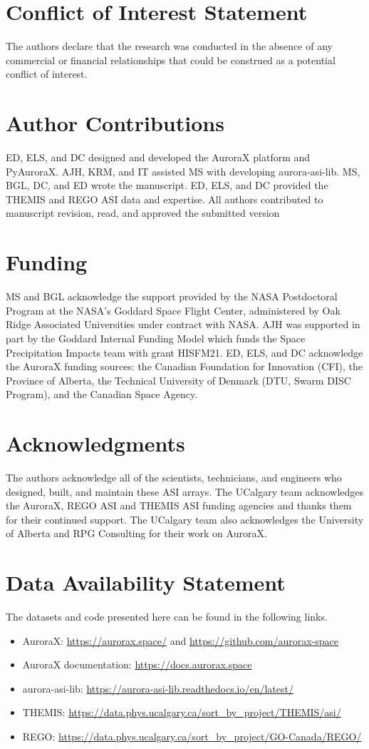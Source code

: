 \documentclass[utf8]{FrontiersinHarvard} %
\begin{document}
\section*{Conflict of Interest Statement}
The authors declare that the research was conducted in the absence of any commercial or financial relationships that could be construed as a potential conflict of interest.

\section*{Author Contributions}
ED, ELS, and DC designed and developed the AuroraX platform and PyAuroraX. AJH, KRM, and IT assisted MS with developing aurora-asi-lib. MS, BGL, DC, and ED wrote the manuscript. ED, ELS, and DC provided the THEMIS and REGO ASI data and expertise.  All authors contributed to manuscript revision, read, and approved the submitted version

\section*{Funding}
MS and BGL acknowledge the support provided by the NASA Postdoctoral Program at the NASA's Goddard Space Flight Center, administered by Oak Ridge Associated Universities under contract with NASA. AJH was supported in part by the Goddard Internal Funding Model which funds the Space Precipitation Impacts team with grant HISFM21. ED, ELS, and DC acknowledge the AuroraX funding sources: the Canadian Foundation for Innovation (CFI), the Province of Alberta, the Technical University of Denmark (DTU, Swarm DISC Program), and the Canadian Space Agency.

\section*{Acknowledgments}
The authors acknowledge all of the scientists, technicians, and engineers who designed, built, and maintain these ASI arrays. The UCalgary team acknowledges the AuroraX, REGO ASI and THEMIS ASI funding agencies and thanks them for their continued support. The UCalgary team also acknowledges the University of Alberta and RPG Consulting for their work on AuroraX. 

\section*{Data Availability Statement}
The datasets and code presented here can be found in the following links.
\begin{itemize}
    \item AuroraX: \url{https://aurorax.space/} and \url{https://github.com/aurorax-space}
    \item AuroraX documentation: \url{https://docs.aurorax.space}
    \item aurora-asi-lib: \url{https://aurora-asi-lib.readthedocs.io/en/latest/}
    \item THEMIS: \url{https://data.phys.ucalgary.ca/sort_by_project/THEMIS/asi/}
    \item REGO: \url{https://data.phys.ucalgary.ca/sort_by_project/GO-Canada/REGO/}
\end{itemize}
\end{document}
